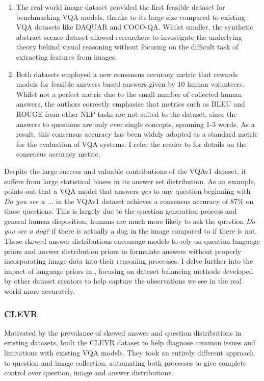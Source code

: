 \begin{enumerate}
    \item The real-world image dataset provided the first feasible dataset for benchmarking VQA models, thanks to its large size compared to existing VQA datasets like DAQUAR and COCO-QA. Whilst smaller, the synthetic abstract scenes dataset allowed researchers to investigate the underlying theory behind visual reasoning without focusing on the difficult task of extracting features from images.
    \item Both datasets employed a new consensus accuracy metric that rewards models for feasible answers based answers given by 10 human volunteers. Whilst not a perfect metric due to the small number of collected human answers, the authors correctly emphasise that metrics such as BLEU and ROUGE from other NLP tasks are not suited to the dataset, since the answers to questions are only ever single concepts, spanning 1-3 words. As a result, this consensus accuracy has been widely adopted as a standard metric for the evaluation of VQA systems. I refer the reader to \subsectionautorefname{ \ref{subsection:consensus_measures}} for details on the consensus accuracy metric.
\end{enumerate}

Despite the large success and valuable contributions of the VQAv1 dataset, it suffers from large statistical biases in its answer set distribution. As an example, \cite{goyal2017making} points out that a VQA model that answers \textit{yes} to any question beginning with \textit{Do you see a ...} in the VQAv1 dataset achieves a consensus accuracy of 87\% on those questions. This is largely due to the question generation process and general human disposition; humans are much more likely to ask the question \textit{Do you see a dog?} if there is actually a dog in the image compared to if there is not. These skewed answer distributions encourage models to rely on question language priors and answer distribution priors to formulate answers without properly incorporating image data into their reasoning processes. I delve further into the impact of language priors in \subsectionautorefname{ \ref{subsec:lanauge_priors_in_vqa_datasets}}, focusing on dataset balancing methods developed by other dataset creators to help capture the observations we see in the real world more accurately.

\subsubsection{CLEVR}
Motivated by the prevalance of skewed answer and question distributions in existing datasets, \citeauthor{johnson2017clevr} built the CLEVR dataset to help diagnose common issues and limitations with existing VQA models. They took an entirely different approach to question and image collection, automating both processes to give complete control over question, image and answer distributions.

